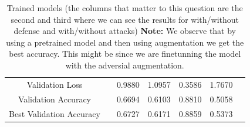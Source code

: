 \documentclass{article}
\begin{document}
\begin{table}[H]
\begin{tabular}{|c|cccccc|}
    Validation Loss             & & 0.9880 & 1.0957 & 0.3586 & 1.7670 & \\
    Validation Accuracy         & & 0.6694 & 0.6103 & 0.8810 & 0.5058 & \\
    Best Validation Accuracy    & & 0.6727 & 0.6171 & 0.8859 & 0.5373 & \\
    \hline
    \end{tabular}
    \caption{Trained models (the columns that matter to this question are the second and third where we can see the results for with/without defense and with/without attacks)\textbf{ Note:} We observe that by using a pretrained model and then using augmentation we get the best accuracy. This might be since we are finetunning the model with the adversial augmentation.}
\end{table}

\end{document}
